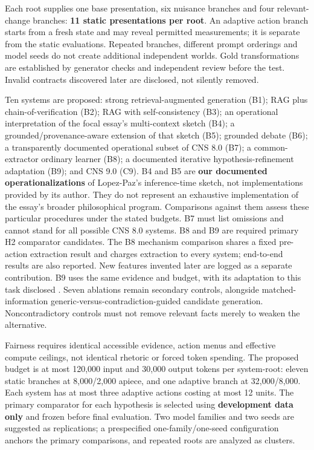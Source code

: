 \documentclass[11pt,a4paper]{article}
\begin{document}
Each root supplies one base presentation, six nuisance branches and four
relevant-change branches: \textbf{11 static presentations per root}. An
adaptive action branch starts from a fresh state and may reveal
permitted measurements; it is separate from the static evaluations.
Repeated branches, different prompt orderings and model seeds do not
create additional independent worlds. Gold transformations are
established by generator checks and independent review before the test.
Invalid contracts discovered later are disclosed, not silently removed.

Ten systems are proposed: strong retrieval-augmented generation (B1);
RAG plus chain-of-verification (B2); RAG with self-consistency (B3); an
operational interpretation of the focal essay's multi-context sketch
(B4); a grounded/provenance-aware extension of that sketch (B5);
grounded debate (B6); a transparently documented operational subset of
CNS 8.0 (B7); a common-extractor ordinary learner (B8); a documented
iterative hypothesis-refinement adaptation (B9); and CNS 9.0 (C9). B4
and B5 are \textbf{our documented operationalizations} of Lopez-Paz's
inference-time sketch, not implementations provided by its author. They
do not represent an exhaustive implementation of the essay's broader
philosophical program. Comparisons against them assess these particular
procedures under the stated budgets. B7 must list omissions and cannot
stand for all possible CNS 8.0 systems. B8 and B9 are required primary
H2 comparator candidates. The B8 mechanism comparison shares a fixed
pre-action extraction result and charges extraction to every system;
end-to-end results are also reported. New features invented later are
logged as a separate contribution. B9 uses the same evidence and budget,
with its adaptation to this task disclosed \citep{R37, R38}. Seven
ablations remain secondary controls, alongside matched-information
generic-versus-contradiction-guided candidate generation.
Noncontradictory controls must not remove relevant facts merely to
weaken the alternative.

Fairness requires identical accessible evidence, action menus and
effective compute ceilings, not identical rhetoric or forced token
spending. The proposed budget is at most 120,000 input and 30,000 output
tokens per system-root: eleven static branches at 8,000/2,000 apiece,
and one adaptive branch at 32,000/8,000. Each system has at most three
adaptive actions costing at most 12 units. The primary comparator for
each hypothesis is selected using \textbf{development data only} and
frozen before final evaluation. Two model families and two seeds are
suggested as replications; a prespecified one-family/one-seed
configuration anchors the primary comparisons, and repeated roots are
analyzed as clusters.
\end{document}
